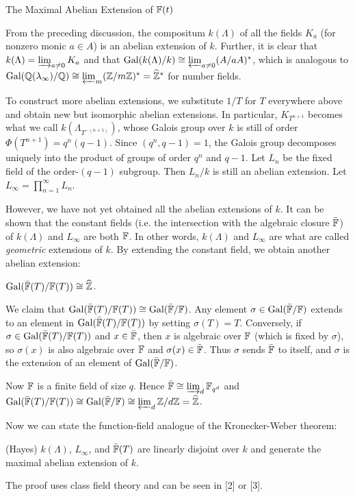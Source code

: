 \documentclass[12pt]{article}
\begin{document}
\begin{section}{The Maximal Abelian Extension of ${\mathbb F}(t)$}

From the preceding discussion, the compositum $k(\Lambda)$ of all the
fields $K_a$ (for nonzero monic $a \in A$) is an abelian extension of $k$.
Further, it is clear that $k(\Lambda) =
\mathop{\varinjlim}_{a\neq 0} K_a$ and that $\operatorname{Gal}(k(\Lambda)/k) \cong
\mathop{\varprojlim}_{a\neq 0} (A/aA)^*$, which is analogous to
$\operatorname{Gal}({\mathbb Q}(\lambda_{\infty})/{\mathbb Q}) \cong \mathop{\varprojlim}_m ({\mathbb Z}/m{\mathbb Z})^*
= {\widehat{{\mathbb Z}}}^*$ for number fields.

To construct more abelian extensions, we substitute $1/T$ for $T$
everywhere above and obtain new but isomorphic abelian extensions.  In
particular, $K_{T^{n+1}}$ becomes what we call $k(\Lambda_{T^{-(n+1)}})$,
whose Galois group over $k$ is still of order $\Phi(T^{n+1}) = q^n(q-1)$.
Since $(q^n, q-1) = 1$, the Galois group decomposes uniquely into the
product of groups of order $q^n$ and $q-1$.  Let $L_n$ be the fixed field
of the order-$(q-1)$ subgroup.  Then $L_n/k$ is still an abelian
extension.  Let $L_\infty = \prod^\infty_{n=1} L_n$.

However, we have not yet obtained all the abelian extensions of $k$.  It
can be shown that the constant fields (i.e. the intersection with the
algebraic closure $\bar{{\mathbb F}}$) of $k(\Lambda)$ and $L_{\infty}$ are both
${\mathbb F}$.  In other words, $k(\Lambda)$ and $L_{\infty}$ are what are called
\emph{geometric} extensions of $k$.  By extending the constant field, we
obtain another abelian extension:

\begin{proposition}
$\operatorname{Gal}(\bar{{\mathbb F}}(T)/{\mathbb F}(T)) \cong \widehat{{\mathbb Z}}$.
\end{proposition}

\pf
We claim that $\operatorname{Gal}(\bar{{\mathbb F}}(T)/{\mathbb F}(T)) \cong \operatorname{Gal}(\bar{{\mathbb F}}/{\mathbb F})$.  Any
element $\sigma \in \operatorname{Gal}(\bar{{\mathbb F}}/{\mathbb F})$ extends to an element in
$\operatorname{Gal}(\bar{{\mathbb F}}(T)/{\mathbb F}(T))$ by setting $\sigma(T) = T$.  Conversely,
if $\sigma \in \operatorname{Gal}(\bar{{\mathbb F}}(T)/{\mathbb F}(T))$ and $x \in \bar{{\mathbb F}}$, then
$x$ is algebraic over ${\mathbb F}$ (which is fixed by $\sigma$), so
$\sigma(x)$ is also algebraic over ${\mathbb F}$ and $\sigma(x) \in \bar{{\mathbb F}}$.
Thus $\sigma$ sends $\bar{{\mathbb F}}$ to itself, and $\sigma$ is the
extension of an element of $\operatorname{Gal}(\bar{{\mathbb F}}/{\mathbb F})$.

Now ${\mathbb F}$ is a finite field of size $q$.  Hence
$\bar{{\mathbb F}} \cong \varinjlim_d {\mathbb F}_{q^d}$ and
$\operatorname{Gal}(\bar{{\mathbb F}}(T)/{\mathbb F}(T)) \cong \operatorname{Gal}(\bar{{\mathbb F}}/{\mathbb F}) \cong
\varprojlim_d {\mathbb Z}/d{\mathbb Z} = \widehat{{\mathbb Z}}$.
\hamlos

Now we can state the function-field analogue of the Kronecker-Weber
theorem:
\begin{theorem}
(Hayes) $k(\Lambda)$, $L_\infty$, and $\bar{{\mathbb F}}(T)$ are linearly
disjoint over $k$ and generate the maximal abelian extension of $k$.
\end{theorem}
The proof uses class field theory and can be seen in [2] or [3].

\end{section} %
\end{document}
